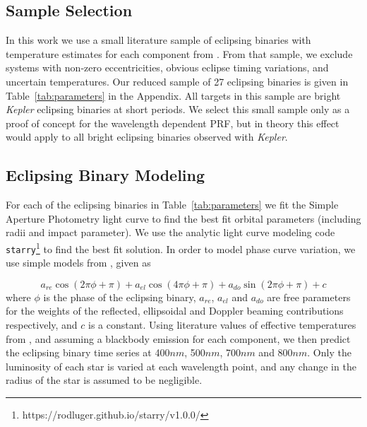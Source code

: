 \documentclass[iop]{emulateapj}
\newcommand{\kepler}{\emph{Kepler}\xspace}
\newcommand{\target}{KIC 2708156\xspace}
\begin{document}
\subsection{Sample Selection}
In this work we use a small literature sample of eclipsing binaries with temperature estimates for each component from \cite{ebliterature}. From that sample, we exclude systems with non-zero eccentricities, obvious eclipse timing variations, and uncertain temperatures. Our reduced sample of 27 eclipsing binaries is given in Table~\ref{tab:parameters} in the Appendix. All targets in this sample are bright \kepler eclipsing binaries at short periods. We select this small sample only as a proof of concept for the wavelength dependent PRF, but in theory this effect would apply to all bright eclipsing binaries observed with \kepler.



\subsection{Eclipsing Binary Modeling}
\label{sec:binarymodel}
For each of the eclipsing binaries in Table~\ref{tab:parameters} we fit the Simple Aperture Photometry light curve to find the best fit orbital parameters (including radii and impact parameter). We use the analytic light curve modeling code \texttt{starry}\footnote{https://rodluger.github.io/starry/v1.0.0/} \citep{starry} to find the best fit solution. In order to model phase curve variation, we use simple models from \cite{beer}, given as

\begin{equation}
\label{eq:phase}
a_{re}\cos(2\pi\phi + \pi) + a_{el}\cos(4\pi\phi + \pi)  + a_{do}\sin(2\pi\phi + \pi) + c
\end{equation}
%
where $\phi$ is the phase of the eclipsing binary, $a_{re}$, $a_{el}$ and $a_{do}$ are free parameters for the weights of the reflected, ellipsoidal and Doppler beaming contributions respectively, and $c$ is a constant.
Using literature values of effective temperatures from \cite{ebliterature}, and assuming a blackbody emission for each component, we then predict the eclipsing binary time series at 400$nm$, 500$nm$, 700$nm$ and 800$nm$.  Only the luminosity of each star is varied at each wavelength point, and any change in the radius of the star is assumed to be negligible.

\end{document}
